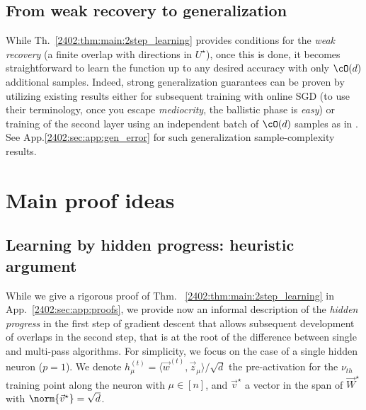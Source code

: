 \subsection{From weak recovery to generalization}
While Th.~\ref{2402:thm:main:2step_learning} provides conditions for the {\it weak recovery} (a finite overlap with directions in $U^\star$), once this is done, it becomes straightforward to learn the function up to any desired accuracy with only $\cO(d)$ additional samples.  Indeed, strong generalization guarantees can be proven by utilizing existing results either for subsequent training with online SGD \citep{arous2021online} (to use their terminology, once you escape {\it mediocrity}, the ballistic phase is {\it easy}) or training of the second layer using an independent batch of $\cO(d)$ samples as in \citep{damian2022neural,abbe2023sgd}. See App.\ref{2402:sec:app:gen_error} for such generalization sample-complexity results.



\section{Main proof ideas}

\subsection{Learning by hidden progress: heuristic argument}\label{2402:sec:hidden_prog}
While we give a rigorous proof of Thm. ~\ref{2402:thm:main:2step_learning} in App.~\ref{2402:sec:app:proofs}, we provide now an informal description of the \textit{hidden progress}  in the first step of gradient descent that allows subsequent development of overlaps in the second step, that is at the root of the difference between single and multi-pass algorithms.
For simplicity, we focus on the case of a single hidden neuron ($p = 1$). 
We denote  $h^{(t)}_\mu = \langle \vec w^{(t)}, \vec z_\mu \rangle / \sqrt{d}$ the pre-activation for the $\nu_{th}$ training point along the neuron  with $\mu \in [n]$, and $\vec{v}^\star$ a vector in the span of $\vec{W}^\star$ with $\norm{\vec{v}^\star} = \sqrt{d}$.


